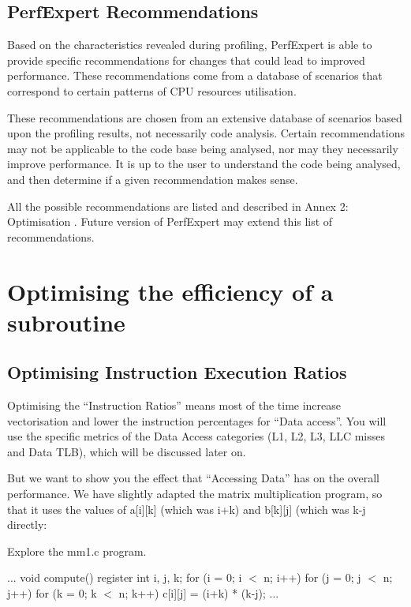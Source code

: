 \subsection{PerfExpert Recommendations}
\label{subsec:Recommendations}

Based on the characteristics revealed during profiling, PerfExpert is able to provide specific recommendations for changes that could lead to improved performance. These recommendations come from a database of scenarios that correspond to certain patterns of CPU resources utilisation.

These recommendations are chosen from an extensive database of scenarios based upon the profiling results, not necessarily code analysis. Certain recommendations may not be applicable to the code base being analysed, nor may they necessarily improve performance. It is up to the user to understand the code being analysed, and then determine if a given recommendation makes sense.

All the possible recommendations are listed and described in Annex 2: Optimisation . Future version of PerfExpert may extend this list of recommendations.

\section{Optimising the efficiency of a subroutine}
\label{sec:Optimizing_the_efficiency_of_a_subroutine}

\subsection{Optimising Instruction Execution Ratios}
\label{subsec:Optimizing_Instruction_Execution_Ratios}

Optimising the ``Instruction Ratios'' means most of the time increase vectorisation and lower the instruction percentages for ``Data access''. You will use the specific metrics of the Data Access categories (L1, L2, L3, LLC misses and Data TLB), which will be discussed later on.

But we want to show you the effect that ``Accessing Data'' has on the overall performance. We have slightly adapted the matrix multiplication program, so that it uses the values of a[i][k] (which was i+k) and b[k][j] (which was k-j directly:

Explore the mm1.c program.

\begin{prompt}
...
void compute()
{
 register int i, j, k;
 for (i = 0; i $<$ n; i++)
   for (j = 0; j $<$ n; j++)
     for (k = 0; k $<$ n; k++)
       c[i][j] = (i+k) * (k-j);
}
...
\end{prompt}

